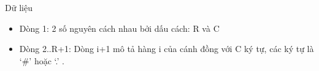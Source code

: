 Dữ liệu
\begin{itemize}
	\item     Dòng 1: 2 số nguyên cách nhau bởi dấu cách: R và C   
	\item     Dòng 2..R+1: Dòng i+1 mô tả hàng i của cánh đồng với C         ký tự, các ký tự là ‘\#’ hoặc ‘.’ .   
\end{itemize}